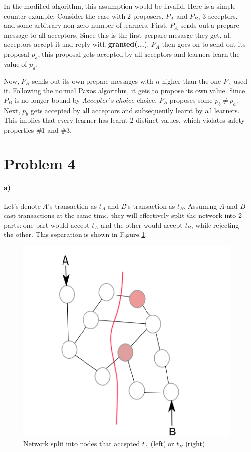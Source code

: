\documentclass[10pt,letter]{article}
\begin{document}
In the modified algorithm, this assumption would be invalid. Here is a simple counter example: Consider the case with 2 proposers, $P_A$ and $P_B$, 3 acceptors, and some arbitrary non-zero number of learners. First, $P_A$ sends out a prepare message to all acceptors. Since this is the first perpare mesasge they get, all acceptors accept it and reply with \textbf{granted(...)}. $P_A$ then goes on to send out its proposal $p_a$, this proposal gets accepted by all acceptors and learners learn the value of $p_a$.

Now, $P_B$ sends out its own prepare messages with $n$ higher than the one $P_A$ used it. Following the normal Paxos algorithm, it gets to propose its own value. Since $P_B$ is no longer bound by $Acceptor's\; choice$ choice, $P_B$ proposes some $p_b \neq p_a$. Next, $p_b$ gets accepted by all acceptors and subsequently learnt by all learners. This implies that every learner has learnt 2 distinct values, which violates safety properties \#1 and \#3.

\section*{Problem 4}

\paragraph{a)} Let's denote $A$'s transaction as $t_A$ and $B$'s transaction as $t_B$. Assuming $A$ and $B$ cast transactions at the same time, they will effectively split the network into 2 parts: one part would accept $t_A$ and the other would accept $t_B$, while rejecting the other. This separation is shown in Figure \ref{fig:split}.

\begin{figure}[h!]
\centering
\includegraphics[scale=0.5,keepaspectratio]{hw8_problem4_a}
\caption{Network split into nodes that accepted $t_A$ (left) or $t_B$ (right)}
\label{fig:split}
\end{figure}
\end{document}
